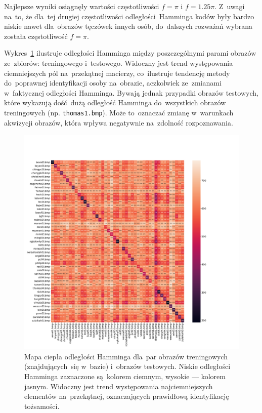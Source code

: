 \documentclass[11pt,a4paper]{article}
\begin{document}
Najlepsze wyniki osiągnęły wartości częstotliwości $f = \pi$ i $f = 1.25 \pi$.
Z~uwagi na~to, że dla~tej drugiej częstotliwości odległości~Hamminga kodów były bardzo niskie nawet dla~obrazów tęczówek innych osób, do~dalszych rozważań wybrana została częstotliwość $f = \pi$.

Wykres~\ref{fig:heatmap} ilustruje odległości Hamminga między poszczególnymi parami obrazów ze~zbiorów: treningowego i~testowego.
Widoczny jest trend występowania ciemniejszych pól na~przekątnej macierzy, co~ilustruje tendencję metody do~poprawnej identyfikacji osoby na~obrazie, aczkolwiek ze~zmianami w~faktycznej odległości Hamminga.
Bywają jednak przypadki obrazów testowych, które wykazują dość~dużą odległość Hamminga do~wszystkich obrazów treningowych (np. \texttt{thomas1.bmp}).
Może to~oznaczać zmianę w~warunkach akwizycji obrazów, która wpływa negatywnie na~zdolność rozpoznawania.

\begin{figure}
    \centering
    \includegraphics[width=\textwidth]{res/img/heatmap.pdf}
    \caption{
        Mapa ciepła odległości Hamminga dla~par obrazów treningowych (znajdujących~się w~bazie) i~obrazów testowych.
        Niskie odległości Hamminga zaznaczone są~kolorem ciemnym, wysokie --- kolorem jasnym.
        Widoczny jest trend występowania najciemniejszych elementów na~przekątnej, oznaczających prawidłową identyfikację tożsamości.
    }
    \label{fig:heatmap}
\end{figure}
\end{document}
